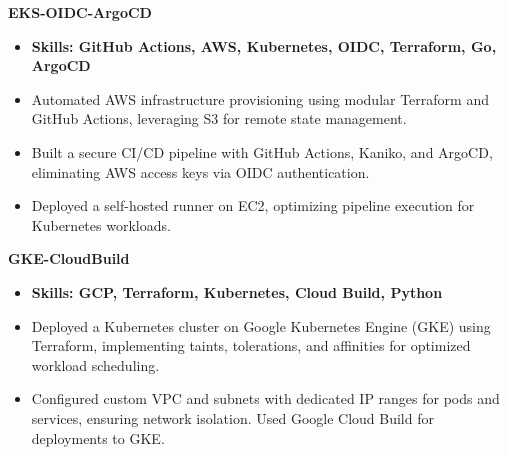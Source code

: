 \documentclass[11pt,a4paper]{article}
\newenvironment{dashlist}{
  \begin{itemize}[label={--}]
}{
  \end{itemize}
}
\begin{document}
\noindent\textbf{EKS-OIDC-ArgoCD}
\begin{itemize}
\item \textbf{Skills: GitHub Actions, AWS, Kubernetes, OIDC, Terraform, Go, ArgoCD}
\end{itemize}
\begin{dashlist}
    \item Automated AWS infrastructure provisioning using modular Terraform and GitHub Actions, leveraging S3 for remote state management.
    \item Built a secure CI/CD pipeline with GitHub Actions, Kaniko, and ArgoCD, eliminating AWS access keys via OIDC authentication.
    \item Deployed a self-hosted runner on EC2, optimizing pipeline execution for Kubernetes workloads.
\end{dashlist}
\vspace{0.5em}

\noindent\textbf{GKE-CloudBuild}
\begin{itemize}
\item \textbf{Skills: GCP, Terraform, Kubernetes, Cloud Build, Python}
\end{itemize}
\begin{dashlist}
    \item Deployed a Kubernetes cluster on Google Kubernetes Engine (GKE) using Terraform, implementing taints, tolerations, and affinities for optimized workload scheduling.
    \item Configured custom VPC and subnets with dedicated IP ranges for pods and services, ensuring network isolation. Used Google Cloud Build for deployments to GKE.
\end{dashlist}
\vspace{0.5em}

\end{document}
